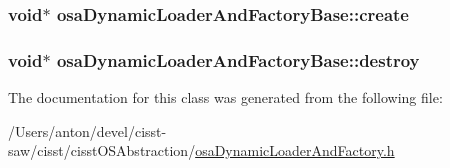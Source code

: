 \subsubsection[{create}]{\setlength{\rightskip}{0pt plus 5cm}void$\ast$ osa\+Dynamic\+Loader\+And\+Factory\+Base\+::create\hspace{0.3cm}{\ttfamily [protected]}}\label{classosa_dynamic_loader_and_factory_base_a556db3b26b86567344a0506526116bf9}
\hypertarget{classosa_dynamic_loader_and_factory_base_a60d6c5d15b4954faa92bd00aa238adfc}{}
\subsubsection[{destroy}]{\setlength{\rightskip}{0pt plus 5cm}void$\ast$ osa\+Dynamic\+Loader\+And\+Factory\+Base\+::destroy\hspace{0.3cm}{\ttfamily [protected]}}\label{classosa_dynamic_loader_and_factory_base_a60d6c5d15b4954faa92bd00aa238adfc}


The documentation for this class was generated from the following file\+:\begin{DoxyCompactItemize}
\item 
/\+Users/anton/devel/cisst-\/saw/cisst/cisst\+O\+S\+Abstraction/\hyperlink{osa_dynamic_loader_and_factory_8h}{osa\+Dynamic\+Loader\+And\+Factory.\+h}\end{DoxyCompactItemize}
